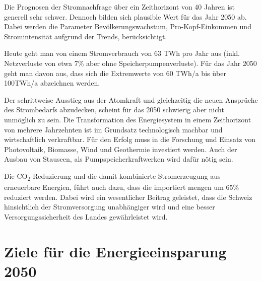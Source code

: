 Die Prognosen der Stromnachfrage über ein Zeithorizont von 40 Jahren ist generell sehr schwer\cite{eth_energiezukunft_schweiz}.
Dennoch bilden sich plausible Wert für das Jahr 2050 ab. Dabei werden die Parameter Bevölkerungswachstum,
Pro-Kopf-Einkommen und Stromintensität aufgrund der Trends, berücksichtigt.
\par
Heute geht man von einem Stromverbrauch von 63 TWh pro Jahr aus (inkl. Netzverluste von etwa 7\% aber
ohne Speicherpumpenverluste). Für das Jahr 2050 geht man davon aus, dass sich die Extremwerte von
60 TWh/a bis über 100TWh/a abzeichnen werden.
\par
Der schrittweise Ausstieg aus der Atomkraft und gleichzeitig die neuen Ansprüche des Strombedarfs abzudecken,
scheint für das 2050 schwierig aber nicht unmöglich zu sein. Die Transformation des Energiesystem in einem
Zeithorizont von mehrere Jahrzehnten ist im Grundsatz technologisch machbar und wirtschaftlich verkraftbar.
Für den Erfolg muss in die Forschung und Einsatz von Photovoltaik, Biomasse, Wind und Geothermie investiert werden.
Auch der Ausbau von Stauseen, als Pumpspeicherkraftwerken wird dafür nötig sein.
\par
Die CO\textsubscript{2}-Reduzierung und die damit kombinierte Stromerzeugung aus erneuerbare Energien, führt auch dazu,
dass die importiert mengen um 65\% reduziert werden. Dabei wird ein wesentlicher Beitrag geleistet, dass die Schweiz
hinsichtlich der Stromversorgung unabhängiger wird und eine besser  Versorgungssicherheit des Landes gewährleistet wird.
 


\section{Ziele für die Energieeinsparung 2050}






